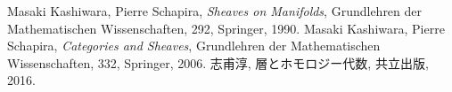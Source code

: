 \clearpage
\begin{thebibliography}{20} 
     Masaki Kashiwara, Pierre Schapira, 
        \textit{Sheaves on Manifolds}, 
        Grundlehren der Mathematischen Wissenschaften, 292, Springer, 1990.
         Masaki Kashiwara, Pierre Schapira, 
        \textit{Categories and Sheaves}, 
        Grundlehren der Mathematischen Wissenschaften, 332, Springer, 2006.
         志甫淳, 層とホモロジー代数, 共立出版, 2016.
\end{thebibliography}


\layout


